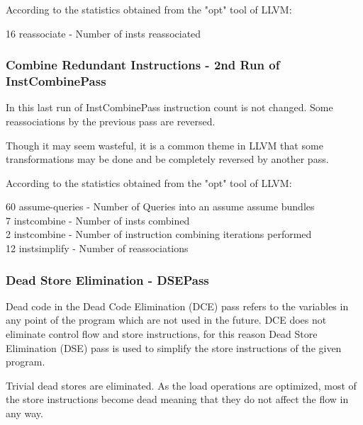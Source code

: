 According to the statistics obtained from the "opt" tool of LLVM:
\begin{displayquote}
    16 reassociate - Number of insts reassociated
\end{displayquote}


\subsubsection{Combine Redundant Instructions - 2nd Run of InstCombinePass}
In this last run of InstCombinePass instruction count is not changed. Some reassociations by the previous pass are reversed.





Though it may seem wasteful, it is a common theme in LLVM that some transformations may be done and be completely reversed by another pass. 


According to the statistics obtained from the "opt" tool of LLVM:
\begin{displayquote}
60 assume-queries - Number of Queries into an assume assume bundles \\
 7 instcombine    - Number of insts combined \\
 2 instcombine    - Number of instruction combining iterations performed \\
12 instsimplify   - Number of reassociations \\
\end{displayquote}


\subsubsection{Dead Store Elimination - DSEPass}
Dead code in the Dead Code Elimination (DCE) pass refers to the variables in any point of the program which are not used in the future. DCE does not eliminate control flow and store instructions, for this reason Dead Store Elimination (DSE) pass is used to simplify the store instructions of the given program.

Trivial dead stores are eliminated. As the load operations are optimized, most of the store instructions become dead meaning that they do not affect the flow in any way.

